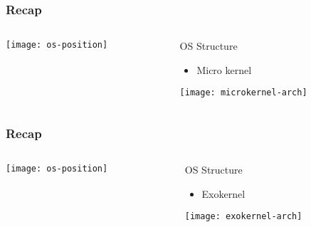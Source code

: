 \begin{frame}[plain]
	\frametitle{Recap}
	
	
	
	\begin{columns}
		
		\begin{column}{.5\textwidth}
			
			\texttt{[image: os-position]}
			
		\end{column}
		
		\begin{column}{.5\textwidth}
			
			\Large
			OS Structure	
			\begin{itemize}
					\item Micro kernel
			\end{itemize}	
			
			\texttt{[image: microkernel-arch]}		
		\end{column}
		
		
	\end{columns}
	
	
\end{frame}

\begin{frame}[plain]
	\frametitle{Recap}
	
	
	
	\begin{columns}
		
		\begin{column}{.5\textwidth}
			
			\texttt{[image: os-position]}
			
		\end{column}
		
		\begin{column}{.5\textwidth}
			
			\Large
			OS Structure	
			\begin{itemize}
					\item Exokernel
			\end{itemize}	
			
			\texttt{[image: exokernel-arch]}		
		\end{column}
		
		
	\end{columns}
	
	
\end{frame}

